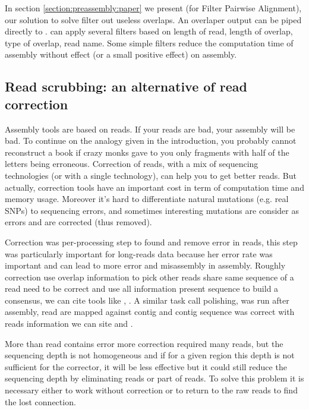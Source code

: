 \documentclass[main.tex]{subfiles}
\begin{document}
In section \ref{section:preassembly:paper} we present \fpa (for Filter Pairwise Alignment), our solution to solve filter out useless overlaps. An overlaper output can be piped directly to \fpa. \fpa can apply several filters based on length of read, length of overlap, type of overlap, read name. Some simple \fpa filters reduce the computation time of assembly without effect (or a small positive effect) on assembly.


\subsection{Read scrubbing: an alternative of read correction} \label{sec:preasm:intro_yacrd}

Assembly tools are based on reads. If your reads are bad, your assembly will be bad. To continue on the analogy given in the introduction, you probably cannot reconstruct a book if crazy monks gave to you only fragments with half of the letters being erroneous. Correction of reads, with a mix of sequencing technologies (or with a single technology), can help you to get better reads. But actually, correction tools have an important cost in term of computation time and memory usage. Moreover it's hard to differentiate natural mutations (e.g. real SNPs) to sequencing errors, and sometimes interesting mutations are consider as errors and are corrected (thus removed).

Correction was per-processing step to found and remove error in reads, this step was particularly important for long-reads data because her error rate was important and can lead to more error and misassembly in assembly. Roughly correction use overlap information to pick other reads share same sequence of a read need to be correct and use all information present sequence to build a consensus, we can cite tools like \cite{MECAT}, \cite{CONSENT}. A similar task call polishing, was run after assembly, read are mapped against contig and contig sequence was correct with reads information we can site \cite{racon} and .

More than read contains error more correction required many reads, but the sequencing depth is not homogeneous and if for a given region this depth is not sufficient for the corrector, it will be less effective but it could still reduce the sequencing depth by eliminating reads or part of reads. To solve this problem it is necessary either to work without correction or to return to the raw reads to find the lost connection.
\end{document}
